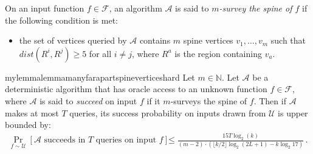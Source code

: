 \documentclass[11pt]{article}
\begin{document}
\begin{definition}
On an input function $f \in \mathcal{F}$,  an 
algorithm ${\mathcal{A}}$ is said to \emph{$m$-survey the spine of $f$} if the following condition is met:
\begin{itemize}
    \item the set of vertices queried by ${\mathcal{A}}$ contains  $m$ spine vertices $v_1, \ldots, v_m$ such that $dist(R^i, R^j) \geq 5$ for all $i \neq j$, where $R^{a}$ is the region containing $v_{a}$.
\end{itemize}
\end{definition}

\begin{restatable}{mylemma}{lemmamanyfarapartspineverticeshard}
\label{lem:many-far-apart-spine-vertices-hard}
Let $m \in \mathbb{N}$. Let $\mathcal{A}$ be a deterministic algorithm that has oracle access to an unknown function  $f \in \mathcal{F}$, where $\mathcal{A}$ is said to \emph{succeed} on input $f$ if it $m$-surveys the spine of $f$. Then if $\mathcal{A}$ makes at most $T$ queries, its success probability on inputs drawn from $\mathcal{U}$ is upper bounded by:
\begin{align}
    \Pr_{f \sim \mathcal{U}} [\text{$\mathcal{A}$ succeeds in $T$ queries on input $f$}] &\leq \frac{15 T \log_2(k)}{(m-2) \cdot \left(\lfloor k/2 \rfloor \log_2(2L+1) - k \log_2{17}\right)} \,.
\end{align}
\end{restatable}
\end{document}
